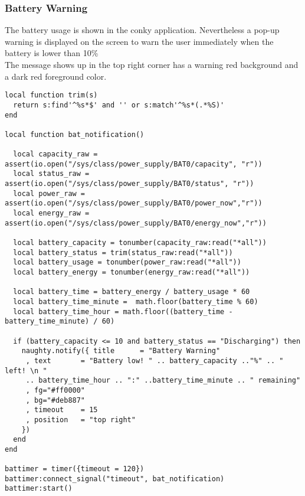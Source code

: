 			\subsubsection{Battery Warning}
				The battery usage is shown in the conky application. Nevertheless a pop-up warning is displayed on the screen to warn the user immediately when the battery is lower than 10\%\\
				The message shows up in the top right corner has a warning red background and a dark red foreground color.\\
				\begin{lstlisting}
local function trim(s)
  return s:find'^%s*$' and '' or s:match'^%s*(.*%S)'
end

local function bat_notification()
  
  local capacity_raw = assert(io.open("/sys/class/power_supply/BAT0/capacity", "r"))
  local status_raw = assert(io.open("/sys/class/power_supply/BAT0/status", "r"))
  local power_raw = assert(io.open("/sys/class/power_supply/BAT0/power_now","r"))
  local energy_raw = assert(io.open("/sys/class/power_supply/BAT0/energy_now","r"))
  
  local battery_capacity = tonumber(capacity_raw:read("*all"))
  local battery_status = trim(status_raw:read("*all"))
  local battery_usage = tonumber(power_raw:read("*all"))
  local battery_energy = tonumber(energy_raw:read("*all"))
  
  local battery_time = battery_energy / battery_usage * 60
  local battery_time_minute =  math.floor(battery_time % 60)
  local battery_time_hour = math.floor((battery_time - battery_time_minute) / 60)

  if (battery_capacity <= 10 and battery_status == "Discharging") then
    naughty.notify({ title      = "Battery Warning"
	 , text       = "Battery low! " .. battery_capacity .."%" .. " left! \n " 
	 .. battery_time_hour .. ":" ..battery_time_minute .. " remaining"
	 , fg="#ff0000"
	 , bg="#deb887"
	 , timeout    = 15
	 , position   = "top right"
    })
  end
end

battimer = timer({timeout = 120})
battimer:connect_signal("timeout", bat_notification)
battimer:start()
				\end{lstlisting}
				
